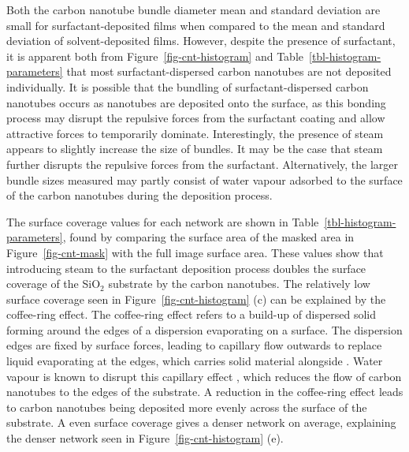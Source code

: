 \documentclass[
  a4paper,
]{scrbook}
\begin{document}
Both the carbon nanotube bundle diameter mean and standard deviation are
small for surfactant-deposited films when compared to the mean and
standard deviation of solvent-deposited films. However, despite the
presence of surfactant, it is apparent both from
Figure~\ref{fig-cnt-histogram} and Table~\ref{tbl-histogram-parameters}
that most surfactant-dispersed carbon nanotubes are not deposited
individually. It is possible that the bundling of surfactant-dispersed
carbon nanotubes occurs as nanotubes are deposited onto the surface, as
this bonding process may disrupt the repulsive forces from the
surfactant coating and allow attractive forces to temporarily dominate.
Interestingly, the presence of steam appears to slightly increase the
size of bundles. It may be the case that steam further disrupts the
repulsive forces from the surfactant. Alternatively, the larger bundle
sizes measured may partly consist of water vapour adsorbed to the
surface of the carbon nanotubes during the deposition process.

The surface coverage values for each network are shown in
Table~\ref{tbl-histogram-parameters}, found by comparing the surface
area of the masked area in Figure~\ref{fig-cnt-mask} with the full image
surface area. These values show that introducing steam to the surfactant
deposition process doubles the surface coverage of the SiO\(_2\)
substrate by the carbon nanotubes. The relatively low surface coverage
seen in Figure~\ref{fig-cnt-histogram} (c) can be explained by the
coffee-ring effect. The coffee-ring effect refers to a build-up of
dispersed solid forming around the edges of a dispersion evaporating on
a surface. The dispersion edges are fixed by surface forces, leading to
capillary flow outwards to replace liquid evaporating at the edges,
which carries solid material alongside
\autocite{Deegan1997,VanGaalen2021}. Water vapour is known to disrupt
this capillary effect \autocite{Bishop2020}, which reduces the flow of
carbon nanotubes to the edges of the substrate. A reduction in the
coffee-ring effect leads to carbon nanotubes being deposited more evenly
across the surface of the substrate. A even surface coverage gives a
denser network on average, explaining the denser network seen in
Figure~\ref{fig-cnt-histogram} (e).
\end{document}
